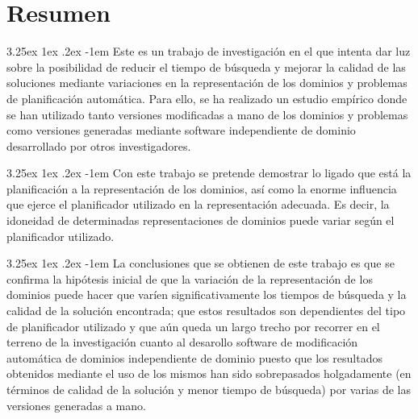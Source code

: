 \documentclass{article}
\makeatletter
\renewcommand\paragraph{\@startsection{paragraph}{5}{\z@}%
      {3.25ex \@plus1ex \@minus.2ex}%
      {-1em}%
      {\normalfont\normalsize\bfseries}}
\makeatother
\begin{document}
    \clearpage\thispagestyle{empty}\null\newpage
    
    \setcounter{page}{1}
    \tableofcontents
    \pagebreak
    \listoffigures
    \pagebreak
    \listoftables
    \pagebreak
    
    
    
    
    \section{Resumen}
    \paragraph{}
    Este es un trabajo de investigación en el que intenta dar luz sobre la posibilidad de reducir el tiempo de búsqueda y mejorar la calidad de las soluciones mediante variaciones en la representación de los dominios y problemas de planificación automática. Para ello, se ha realizado un estudio empírico donde se han utilizado tanto versiones modificadas a mano de los dominios y problemas como versiones generadas mediante software independiente de dominio desarrollado por otros investigadores.
    
    \paragraph{}
    Con este trabajo se pretende demostrar lo ligado que está la planificación a la representación de los dominios, así como la enorme influencia que ejerce el planificador utilizado en la representación adecuada. Es decir, la idoneidad de determinadas representaciones de dominios puede variar según el planificador utilizado.
    
    
    \paragraph{}
    La conclusiones que se obtienen de este trabajo es que se confirma la hipótesis inicial de que la variación de la representación de los dominios puede hacer que varíen significativamente los tiempos de búsqueda y la calidad de la solución encontrada; que estos resultados son dependientes del tipo de planificador utilizado y que aún queda un largo trecho por recorrer en el terreno de la investigación cuanto al desarollo software de modificación automática de dominios independiente de dominio puesto que los resultados obtenidos mediante el uso de los mismos han sido sobrepasados holgadamente (en términos de calidad de la solución y menor tiempo de búsqueda) por varias de las versiones generadas a mano. \\ \\ \\
    
\end{document}
